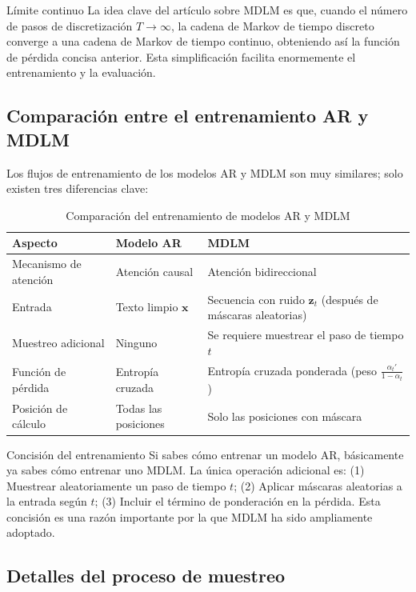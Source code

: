 \documentclass[a4paper]{article}
\begin{document}
\begin{importantbox}{Límite continuo}
La idea clave del artículo sobre MDLM es que, cuando el número de pasos de discretización $T \to \infty$, la cadena de Markov de tiempo discreto converge a una cadena de Markov de tiempo continuo, obteniendo así la función de pérdida concisa anterior. Esta simplificación facilita enormemente el entrenamiento y la evaluación.
\end{importantbox}

\subsection{Comparación entre el entrenamiento AR y MDLM}

Los flujos de entrenamiento de los modelos AR y MDLM son muy similares; solo existen tres diferencias clave:

\begin{table}[H]
\centering
\caption{Comparación del entrenamiento de modelos AR y MDLM}
\begin{tabular}{@{}lll@{}}
\toprule
\textbf{Aspecto} & \textbf{Modelo AR} & \textbf{MDLM} \\
\midrule
Mecanismo de atención & Atención causal & Atención bidireccional \\
Entrada & Texto limpio $\mathbf{x}$ & Secuencia con ruido $\mathbf{z}_t$ (después de máscaras aleatorias) \\
Muestreo adicional & Ninguno & Se requiere muestrear el paso de tiempo $t$ \\
Función de pérdida & Entropía cruzada & Entropía cruzada ponderada (peso $\frac{\alpha_t'}{1-\alpha_t}$) \\
Posición de cálculo & Todas las posiciones & Solo las posiciones con máscara \\
\bottomrule
\end{tabular}
\end{table}

\begin{knowledgebox}{Concisión del entrenamiento}
Si sabes cómo entrenar un modelo AR, básicamente ya sabes cómo entrenar uno MDLM. La única operación adicional es: (1) Muestrear aleatoriamente un paso de tiempo $t$; (2) Aplicar máscaras aleatorias a la entrada según $t$; (3) Incluir el término de ponderación en la pérdida. Esta concisión es una razón importante por la que MDLM ha sido ampliamente adoptado.
\end{knowledgebox}

\subsection{Detalles del proceso de muestreo}
\end{document}

